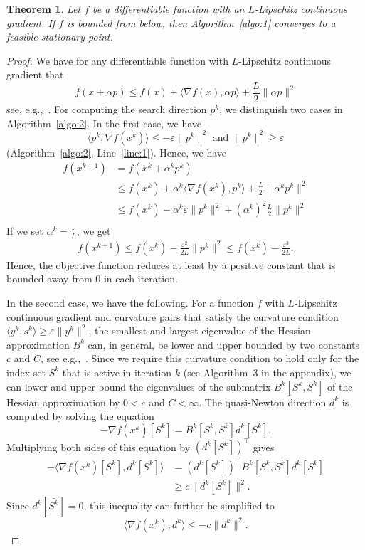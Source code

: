 \documentclass[letterpaper]{article} %
\newtheorem{theorem}{Theorem}
\newcommand{\setR}{\mathbb{R}}
\newcommand{\vareps}{\varepsilon}
\newcommand{\sprod}[2]{\langle{#1}, {#2}\rangle}
\begin{document}
\begin{theorem}\label{thm:1}
Let $f$ be a differentiable function with an $L$-Lipschitz continuous gradient. %
If $f$ is bounded from below, then Algorithm~\ref{algo:1} converges to a feasible stationary point.
\end{theorem}

\begin{proof}
We have for any differentiable %
function with $L$-Lipschitz continuous gradient that
\[
  f(x+\alpha p) \leq f(x) + \sprod{\nabla f(x)}{\alpha p} + \frac{L}{2} \|\alpha p\|^2
\]
see, e.g.,~\cite{Nesterov04}. For computing the search direction $p^k$, we distinguish two cases in Algorithm~\ref{algo:2}. In the first case, we have
\[
\sprod{p^k}{\nabla f(x^k)} \leq -\vareps \|p^k\|^2 \mbox{ and } \|p^k\|^2 \geq \vareps
\] (Algorithm~\ref{algo:2}, Line~\ref{line:1}). Hence, we have
\[
\begin{split}
f(x^{k+1}) & = f(x^k+\alpha^kp^k) \\
& \leq f(x^k) + \alpha^k\sprod{\nabla f(x^k)}{p^k} + \frac{L}{2}\|\alpha^k p^k\|^2 \\
& \leq f(x^k) - \alpha^k \vareps\|p^k\|^2 + (\alpha^k)^2\frac{L}{2}\|p^k\|^2 \\
\end{split}
\]
If we set $\alpha^k = \frac{\vareps}{L}$, we get
\[
\begin{split}
f(x^{k+1}) \leq f(x^k) - \frac{\vareps^2}{2L}\|p^k\|^2 \leq f(x^k) - \frac{\varepsilon^3}{2L}.
\end{split}
\]
Hence, the objective function reduces at least by a positive constant that is bounded away from $0$ in each iteration.

In the second case, we have the following. For a function $f$ with $L$-Lipschitz continuous gradient and curvature pairs that satisfy the curvature condition $\sprod{y^k}{s^k}\geq \vareps \|y^k\|^2$, the smallest and largest eigenvalue of the Hessian approximation $B^k$ can, in general, be lower and upper bounded by two constants $c$ and $C$, see e.g.,~\cite{MokhtariR15}. Since we require this curvature condition to hold only for the index set $S^k$ that is active in iteration $k$ (see Algorithm~3 in the appendix), we can lower and upper bound the eigenvalues of the submatrix $B^k[S^k, S^k]$ of the Hessian approximation by $0<c$ and $C<\infty$. %
The quasi-Newton direction $d^k$ is computed by solving the equation
\[
-\nabla f(x^k)[S^k]=B^k[S^k, S^k] d^k[S^k].
\]
Multiplying both sides of this equation by $\left(d^k[S^k]\right)^\top$ gives
\[
\begin{split}
-\sprod{\nabla f(x^k)[S^k]}{d^k[S^k]} &=\left(d^k[S^k]\right)^\top B^k[S^k, S^k] d^k[S^k] \\ & \geq c\|d^k[S^k]\|^2.
\end{split}
\]
Since $d^k[\bar{S^k}]=0$, this inequality can further be simplified to
\begin{equation}\label{eq:1}
\sprod{\nabla f(x^k)}{d^k}  \leq -c\|d^k\|^2.
\end{equation}


\end{proof}
\end{document}
